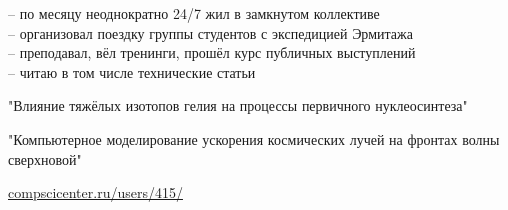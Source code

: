 \vspace{-1.5em}
\begin{multicols}{2}
 \givenskill

 \givenskill
\end{multicols}

    \cvtag{\LaTeX}

\divider


 -- по месяцу неоднократно 24/7 жил в замкнутом коллективе\\[0.5em]
 -- организовал поездку группы студентов с экспедицией Эрмитажа\\[0.5em]
 -- преподавал, вёл тренинги, прошёл курс публичных выступлений\\[0.5em]
 -- читаю в том числе технические статьи

"Влияние тяжёлых изотопов гелия на процессы первичного нуклеосинтеза"

\vspace{0.5em}
"Компьютерное моделирование ускорения космических лучей на фронтах волны сверхновой"

\vspace{0.5em}
\href{https://compscicenter.ru/users/415/}{compscicenter.ru/users/415/}
